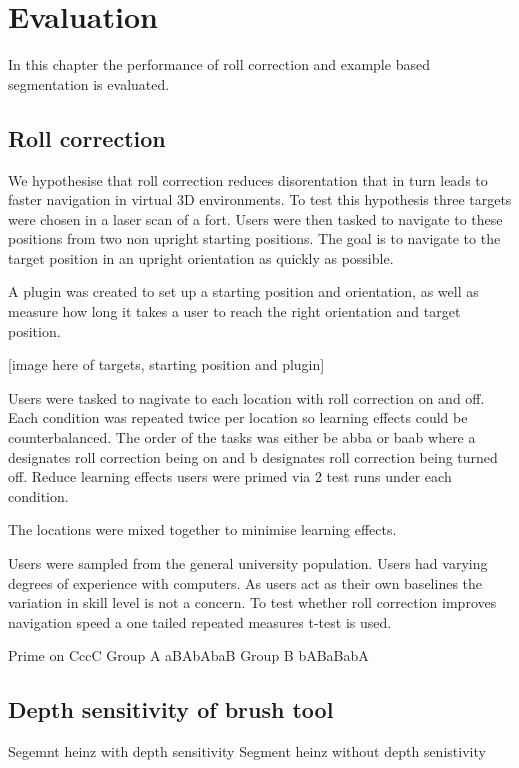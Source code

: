 \chapter{Evaluation} \label{ch:eval}

In this chapter the performance of roll correction and example based segmentation is evaluated.

\section{Roll correction}

We hypothesise that roll correction reduces disorentation that in turn leads to faster navigation in virtual 3D environments. To test this hypothesis three targets were chosen in a laser scan of a fort. Users were then tasked to navigate to these positions from two non upright starting positions. The goal is to navigate to the target position in an upright orientation as quickly as possible.

A plugin was created to set up a starting position and orientation, as well as measure how long it takes a user to reach the right orientation and target position.

[image here of targets, starting position and plugin]

Users were tasked to nagivate to each location with roll correction on and off. Each condition was repeated twice per location so learning effects could be counterbalanced. The order of the tasks was either be abba or baab where a designates roll correction being on and b designates roll correction being turned off. Reduce learning effects users were primed via 2 test runs under each condition.

The locations were mixed together to minimise learning effects.

Users were sampled from the general university population. Users had varying degrees of experience with computers. As users act as their own baselines the variation in skill level is not a concern. To test whether roll correction improves navigation speed a one tailed repeated measures t-test is used.

Prime on CccC
Group A aBAbAbaB
Group B bABaBabA

\section{Depth sensitivity of brush tool}

Segemnt heinz with depth sensitivity
Segment heinz without depth senistivity


